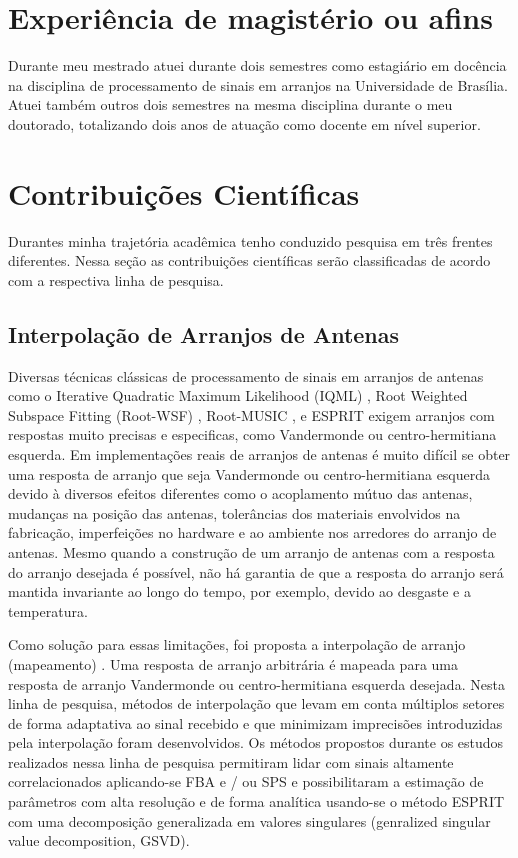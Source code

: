 \documentclass[12pt]{article}
\begin{document}
\section{Experiência de magistério ou afins}

Durante meu mestrado atuei durante dois semestres como estagiário em docência na disciplina de processamento de sinais em arranjos na Universidade de Brasília. Atuei também outros dois semestres na mesma disciplina durante o meu doutorado, totalizando dois anos de atuação como docente em nível superior.

\section{Contribuições Científicas}

Durantes minha trajetória acadêmica tenho conduzido pesquisa em três frentes diferentes. Nessa seção as contribuições científicas serão classificadas de acordo com a respectiva linha de pesquisa.

\subsection{Interpolação de Arranjos de Antenas}

Diversas técnicas clássicas de processamento de sinais em arranjos de antenas como o Iterative
Quadratic Maximum Likelihood (IQML) \cite{Bresler1986},  Root Weighted Subspace Fitting (Root-WSF)
\cite{Stoica1990a}, Root-MUSIC \cite{Barabell1983}, e ESPRIT \cite{Roy1989} exigem arranjos com respostas muito precisas e especificas, como Vandermonde ou centro-hermitiana esquerda. Em implementações reais de arranjos de antenas é muito difícil se obter uma resposta de arranjo que seja Vandermonde ou centro-hermitiana esquerda devido à diversos efeitos diferentes como o acoplamento mútuo das antenas, mudanças na posição das antenas, tolerâncias dos materiais envolvidos na fabricação, imperfeições no hardware e ao ambiente nos arredores do arranjo de antenas. Mesmo quando a construção de um arranjo de antenas com a resposta do arranjo desejada é possível, não há garantia de que a resposta do arranjo será mantida invariante ao longo do tempo, por exemplo, devido ao desgaste e a temperatura. 

Como solução para essas limitações, foi proposta a interpolação de arranjo (mapeamento) \cite{Bronez1988}. Uma resposta de arranjo arbitrária é mapeada para uma resposta de arranjo Vandermonde ou centro-hermitiana esquerda desejada. Nesta linha de pesquisa, métodos de interpolação que levam em conta múltiplos setores de forma adaptativa ao sinal recebido e que minimizam imprecisões introduzidas pela interpolação foram desenvolvidos. Os métodos propostos durante os estudos realizados nessa linha de pesquisa permitiram lidar com sinais altamente correlacionados aplicando-se FBA \cite{Pillai1989} e / ou SPS \cite{Evans1982} e possibilitaram a estimação de parâmetros com alta resolução e de forma analítica usando-se o método ESPRIT com uma decomposição generalizada em valores singulares (genralized singular value decomposition, GSVD). 
\end{document}
